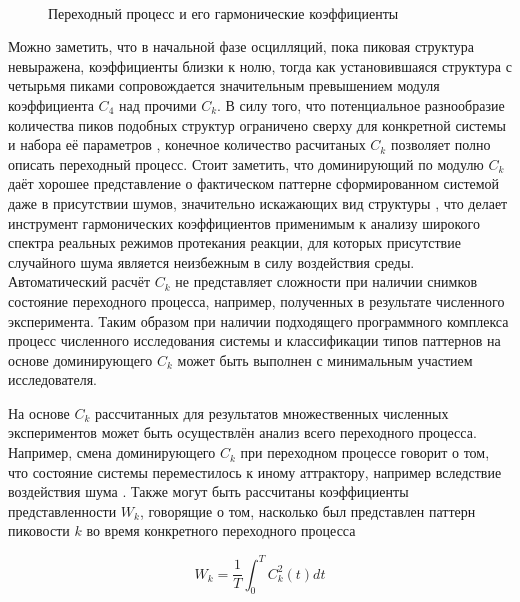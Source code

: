 \begin{figure}[ht]
    \\
    \caption{Переходный процесс и его гармонические коэффициенты}\label{fig:ck_intro}
\end{figure}

Можно заметить, что в начальной фазе осцилляций, пока пиковая структура невыражена, коэффициенты близки к нолю, тогда как установившаяся структура с четырьмя пиками сопровождается значительным превышением модуля коэффициента $C_4$ над прочими $C_k$. В силу того, что потенциальное разнообразие количества пиков подобных структур ограничено сверху для конкретной системы и набора её параметров \cite{woolley2017turing}, конечное количество расчитаных $C_k$ позволяет полно описать переходный процесс. Стоит заметить, что доминирующий по модулю $C_k$ даёт хорошее представление о фактическом паттерне сформированном системой даже в присутствии шумов, значительно искажающих вид структуры \cite{bib1}, что делает инструмент гармонических коэффициентов применимым к анализу широкого спектра реальных режимов протекания реакции, для которых присутствие случайного шума является неизбежным в силу воздействия среды. Автоматический расчёт $C_k$ не представляет сложности при наличии снимков состояние переходного процесса, например, полученных в результате численного эксперимента. Таким образом при наличии подходящего программного комплекса \cite{progbib2} процесс численного исследования системы и классификации типов паттернов на основе доминирующего $C_k$ может быть выполнен с минимальным участием исследователя.

На основе $C_k$ рассчитанных для результатов множественных численных экспериментов может быть осуществлён анализ всего переходного процесса. Например, смена доминирующего $C_k$ при переходном процессе говорит о том, что состояние системы переместилось к иному аттрактору, например вследствие воздействия шума \cite{bib4}. Также могут быть рассчитаны коэффициенты представленности $W_k$, говорящие о том, насколько был представлен паттерн пиковости $k$ во время конкретного переходного процесса

\begin{equation}
    W_k=\frac{1}{T} \int_0^T C_k^2(t) d t
\end{equation}

